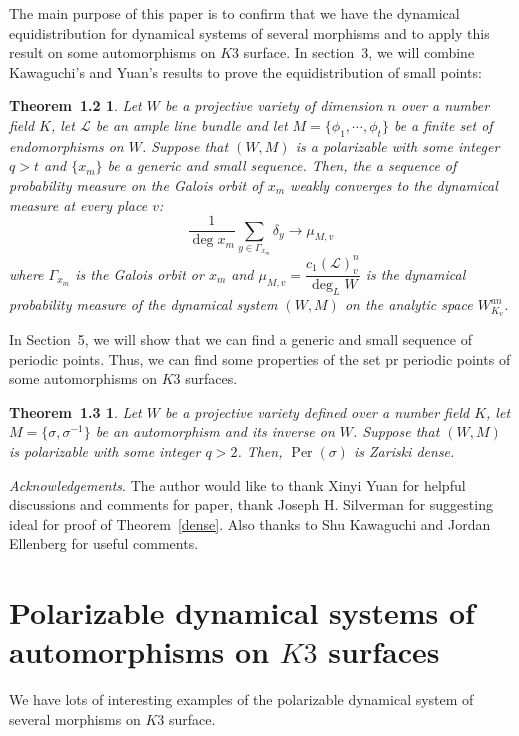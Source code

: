 \documentclass[11pt,letterpaper]{amsart}
\newtheorem*{thm*}{Theorem~1.2}
\newtheorem*{thm**}{Theorem~1.3}
\begin{document}
    The main purpose of this paper is to confirm that we have the dynamical equidistribution for dynamical systems of several morphisms and to apply this result on some automorphisms on $K3$ surface. In section~3, we will combine Kawaguchi's and Yuan's results to prove the equidistribution of small points:
     \begin{thm*}
        Let $W$ be a projective variety of dimension $n$ over a number field $K$, let $\mathcal{L}$ be an ample line bundle and let $M= \{ \phi_1, \cdots, \phi_t\}$ be a finite set of endomorphisms on $W$. Suppose that $(W,M)$ is a polarizable with some integer $q>t$ and $\{ x_m\}$ be a generic and small sequence. Then, the a sequence of probability measure on the Galois orbit of $x_m$ weakly converges to the dynamical measure at every place $v$:
        \[
        \dfrac{1}{\deg x_m} \sum_{y\in \Gamma_{x_m}} \delta_y \rightarrow \mu_{M,v}
        \]
        where $\Gamma_{x_m}$ is the Galois orbit or $x_m$ and $\mu_{M,v} = \dfrac{c_1(\mathcal{L})^n_v}{\deg_L W}$ is the dynamical probability measure of the dynamical system $(W,M)$ on the analytic space $W_{K_v}^{an}$.
    \end{thm*}

    In Section~5, we will show that we can find a generic and small sequence of periodic points. Thus, we can find some properties of the set pr periodic points of some automorphisms on $K3$ surfaces.

    \begin{thm**}
        Let $W$ be a projective variety defined over a number field $K$, let $M = \{\sigma, \sigma^{-1}\}$ be an automorphism and its inverse on $W$. Suppose that $(W,M)$ is polarizable with some integer $q>2$. Then, ${\operatorname{Per}}(\sigma)$ is Zariski dense.
    \end{thm**}

\par\noindent\emph{Acknowledgements}.\enspace
 The author would like to thank Xinyi Yuan for helpful discussions and comments for paper, thank Joseph H. Silverman for suggesting ideal for proof of Theorem~\ref{dense}. Also thanks to Shu Kawaguchi and Jordan Ellenberg for useful comments.

\section{Polarizable dynamical systems of automorphisms on $K3$ surfaces}

    We have lots of interesting examples of the polarizable dynamical system of several morphisms on $K3$ surface.
\end{document}
